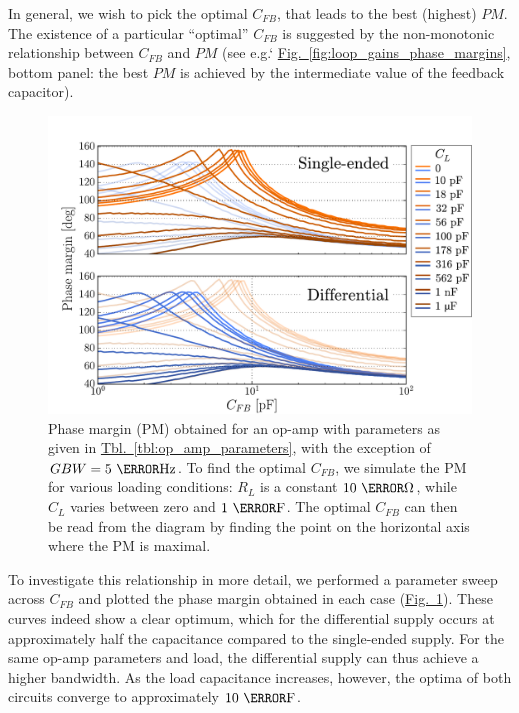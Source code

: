 \documentclass[10pt]{article}
\newcommand{\tablelink}[1]{\hyperref[#1]{Tbl.~\ref*{#1}}\xspace }
\newcommand{\brieffiglink}[1]{\hyperref[#1]{Fig.~\ref*{#1}}}
\begin{document}
In general, we wish to pick the optimal $C_{FB}$, that leads to the best (highest) $PM$. The existence of a particular ``optimal'' $C_{FB}$ is suggested by the non-monotonic relationship between $C_{FB}$ and $PM$ (see e.g.` \brieffiglink{fig:loop_gains_phase_margins}, bottom panel: the best $PM$ is achieved by the intermediate value of the feedback capacitor).

\begin{figure}[t!]
        \centering
        \includegraphics[scale=.6]{sim_phase_margins.pdf}
        \caption{\small Phase margin (PM) obtained for an op-amp with parameters as given in \tablelink{tbl:op_amp_parameters}, with the exception of $GBW=5~\mega\hertz$. To find the optimal $C_{FB}$, we simulate the PM for various loading conditions: $R_L$ is a constant $10~\kilo\ohm$, while $C_L$ varies between zero and $1~\micro\farad$. The optimal $C_{FB}$ can then be read from the diagram by finding the point on the horizontal axis where the PM is maximal.}
        \label{fig:phase_margins}
\end{figure}

To investigate this relationship in more detail, we performed a parameter sweep across $C_{FB}$ and plotted the phase margin obtained in each case (\brieffiglink{fig:phase_margins}). These curves indeed show a clear optimum, which for the differential supply occurs at approximately half the capacitance compared to the single-ended supply. For the same op-amp parameters and load, the differential supply can thus achieve a higher bandwidth. As the load capacitance increases, however, the optima of both circuits converge to approximately $10~\pico\farad$.%
\end{document}
